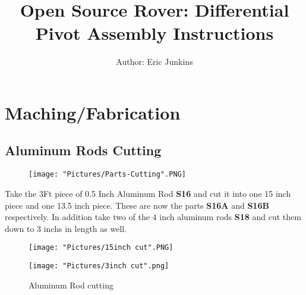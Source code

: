 \documentclass[12pt]{article}
\begin{document}
\title{Open Source Rover: Differential Pivot Assembly Instructions}
\author{Author: Eric Junkins}

\makeatletter         
\def\@maketitle{
\begin{center}	
	\makebox[\textwidth][c]{ \texttt{[image: "Pictures/Differential Pivot".png]}}
	{\Huge \bfseries \sffamily \@title }\\[3ex] 
	{\Large \sffamily \@author}\\[3ex] 
	\texttt{[image: "Pictures/JPL logo".png]}
\end{center}}
\makeatother

\maketitle




\newpage


\tableofcontents

\newpage


\section{Maching/Fabrication}
\subsection{Aluminum Rods Cutting}

\begin{figure}[H]
	\centering
	\texttt{[image: "Pictures/Parts-Cutting".PNG]}
\end{figure}


Take the 3Ft piece of 0.5 Inch Aluminum Rod \textbf{S16} and cut it into one 15 inch piece and one 13.5 inch piece. These are now the parts \textbf{S16A} and \textbf{S16B} respectively. In addition take two of the 4 inch aluminum rods \textbf{S18} and cut them down to 3 inchs in length as well.  

\begin{figure}[H]
  \centering
  \begin{minipage}[b]{0.45\textwidth}
    \texttt{[image: "Pictures/15inch cut".PNG]}
  \end{minipage}
  \hfill
  \begin{minipage}[b]{0.45\textwidth}
    \texttt{[image: "Pictures/3inch cut".png]}
  \end{minipage}
  \caption{Aluminum Rod cutting}
  \label{Al dimensions}
\end{figure}
\end{document}
